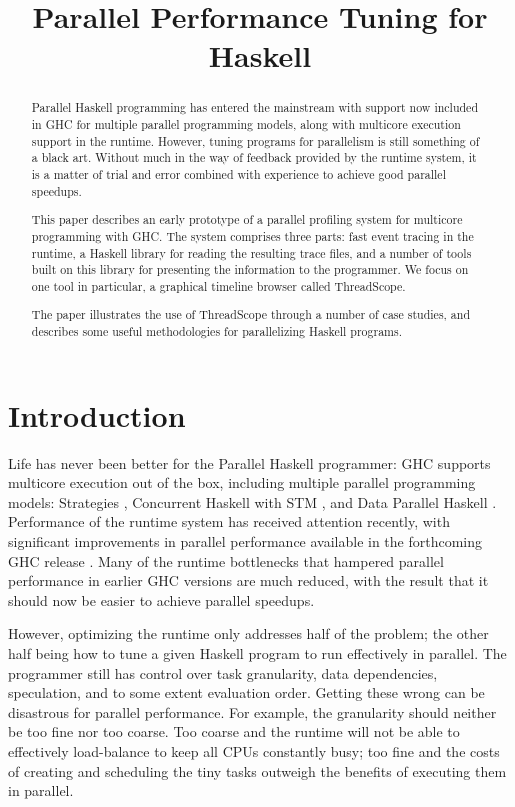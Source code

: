 \documentclass[twocolumn,9pt]{sigplanconf}
\title{Parallel Performance Tuning for Haskell}
\let\cite=\citep
\begin{document}
\maketitle

\begin{abstract}
Parallel Haskell programming has entered the mainstream with support
now included in GHC for multiple parallel programming models, along
with multicore execution support in the runtime.  However, tuning
programs for parallelism is still something of a black art.  Without
much in the way of feedback provided by the runtime system, it is a
matter of trial and error combined with experience to achieve good
parallel speedups.

This paper describes an early prototype of a parallel profiling system
for multicore programming with GHC.  The system comprises three parts:
fast event tracing in the runtime, a Haskell library for reading the
resulting trace files, and a number of tools built on this library for
presenting the information to the programmer.  We focus on one tool in
particular, a graphical timeline browser called ThreadScope.

The paper illustrates the use of ThreadScope through a number of case
studies, and describes some useful methodologies for parallelizing
Haskell programs.
\end{abstract}


\section{Introduction}

Life has never been better for the Parallel Haskell programmer: GHC
supports multicore execution out of the box, including multiple
parallel programming models: Strategies \cite{spj:trin98b}, Concurrent
Haskell \cite{jones96concurrent} with STM \cite{stm}, and Data Parallel Haskell
\cite{dph}.  Performance of the runtime system has received 
attention recently, with significant improvements in parallel
performance available in the forthcoming GHC release \cite{multicore-ghc}.
Many of the runtime bottlenecks that hampered parallel performance in
earlier GHC versions are much reduced, with the result that it should
now be easier to achieve parallel speedups.

However, optimizing the runtime only addresses half of the problem;
the other half being how to tune a given Haskell program to run
effectively in parallel.  The programmer still has control over task
granularity, data dependencies, speculation, and to some extent
evaluation order.  Getting these wrong can be disastrous for parallel
performance. For example, the granularity should neither be too fine
nor too coarse.  Too coarse and the runtime will not be able to
effectively load-balance to keep all CPUs constantly busy; too fine
and the costs of creating and scheduling the tiny tasks outweigh the
benefits of executing them in parallel.
\end{document}
